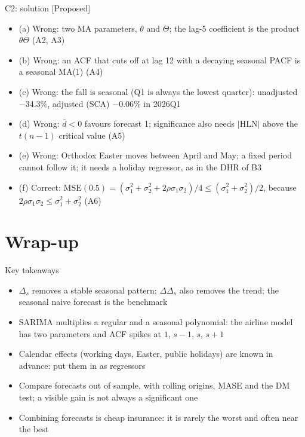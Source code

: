 \ifsolutions
\begin{frame}{C2: solution [Proposed]}
\itemsize{\scriptsize}
\begin{itemize}
    \item (a) Wrong: two MA parameters, $\theta$ and $\Theta$; the lag-5 coefficient is the product $\theta\Theta$ (A2, A3)
    \item (b) Wrong: an ACF that cuts off at lag 12 with a decaying seasonal PACF is a seasonal MA(1) (A4)
    \item (c) Wrong: the fall is seasonal (Q1 is always the lowest quarter): unadjusted $-$34.3\%, adjusted (SCA) $-$0.06\% in 2026Q1
    \item (d) Wrong: $\bar d < 0$ favours forecast 1; significance also needs $|\mathrm{HLN}|$ above the $t(n - 1)$ critical value (A5)
    \item (e) Wrong: Orthodox Easter moves between April and May; a fixed period cannot follow it; it needs a holiday regressor, as in the DHR of B3
    \item (f) Correct: $\mathrm{MSE}(0.5) = (\sigma_1^2 + \sigma_2^2 + 2\rho\sigma_1\sigma_2)/4 \le (\sigma_1^2 + \sigma_2^2)/2$, because $2\rho\sigma_1\sigma_2 \le \sigma_1^2 + \sigma_2^2$ (A6)
\end{itemize}
\end{frame}
\fi


\section{Wrap-up}

\begin{frame}{Key takeaways}
\itemsize{\small}
\begin{itemize}
    \item $\Delta_s$ removes a stable seasonal pattern; $\Delta\Delta_s$ also removes the trend; the seasonal naive forecast is the benchmark
    \item SARIMA multiplies a regular and a seasonal polynomial: the airline model has two parameters and ACF spikes at $1$, $s - 1$, $s$, $s + 1$
    \item Calendar effects (working days, Easter, public holidays) are known in advance: put them in as regressors
    \item Compare forecasts out of sample, with rolling origins, MASE and the DM test; a visible gain is not always a significant one
    \item Combining forecasts is cheap insurance: it is rarely the worst and often near the best
\end{itemize}
\end{frame}

